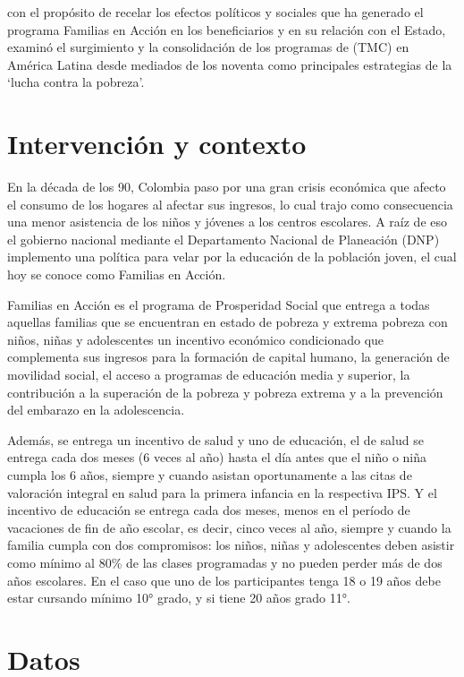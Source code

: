 \documentclass[AER]{AEA}
\begin{document}
\cite{PulidoBuitrago2013LosAccion} con el propósito de recelar los efectos políticos y sociales que ha generado el programa Familias en Acción en los beneficiarios y en su relación con el Estado, examinó el surgimiento y la consolidación de los programas de (TMC) en América Latina desde mediados de los noventa como principales estrategias de la ‘lucha contra la pobreza’.


\section{Intervención y contexto}

En la década de los 90, Colombia paso por una gran crisis económica que afecto el consumo de los hogares al afectar sus ingresos, lo cual trajo como consecuencia una menor asistencia de los niños y jóvenes a los centros escolares. A raíz de eso el gobierno nacional mediante el Departamento Nacional de Planeación (DNP) implemento una política para velar por la educación de la población joven, el cual hoy se conoce como Familias en Acción.

Familias en Acción es el programa de Prosperidad Social que entrega a todas aquellas familias que se encuentran en estado de pobreza y extrema pobreza con niños, niñas y adolescentes un incentivo económico condicionado que complementa sus ingresos para la formación de capital humano, la generación de movilidad social, el acceso a programas de educación media y superior, la contribución a la superación de la pobreza y pobreza extrema y a la prevención del embarazo en la adolescencia. 

Además, se entrega un incentivo de salud y uno de educación, el de salud se entrega cada dos meses (6 veces al año) hasta el día antes que el niño o niña cumpla los 6 años, siempre y cuando asistan oportunamente a las citas de valoración integral en salud para la primera infancia en la respectiva IPS. Y el incentivo de educación se entrega cada dos meses, menos en el período de vacaciones de fin de año escolar, es decir, cinco veces al año, siempre y cuando la familia cumpla con dos compromisos: los niños, niñas y adolescentes deben asistir como mínimo al 80\% de las clases programadas y no pueden perder más de dos años escolares. En el caso que uno de los participantes tenga 18 o 19 años debe estar cursando mínimo 10° grado, y si tiene 20 años grado 11°.


\section{Datos}
\end{document}
